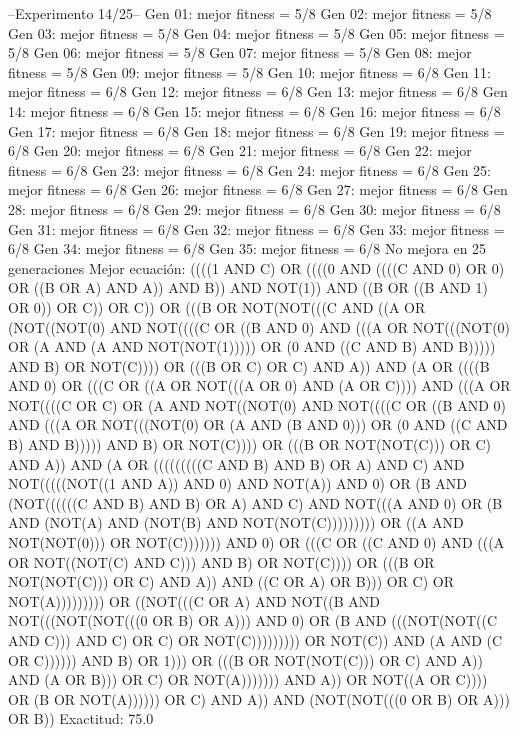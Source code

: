 --Experimento 
 14/25--
Gen 01: mejor fitness = 5/8
Gen 02: mejor fitness = 5/8
Gen 03: mejor fitness = 5/8
Gen 04: mejor fitness = 5/8
Gen 05: mejor fitness = 5/8
Gen 06: mejor fitness = 5/8
Gen 07: mejor fitness = 5/8
Gen 08: mejor fitness = 5/8
Gen 09: mejor fitness = 5/8
Gen 10: mejor fitness = 6/8
Gen 11: mejor fitness = 6/8
Gen 12: mejor fitness = 6/8
Gen 13: mejor fitness = 6/8
Gen 14: mejor fitness = 6/8
Gen 15: mejor fitness = 6/8
Gen 16: mejor fitness = 6/8
Gen 17: mejor fitness = 6/8
Gen 18: mejor fitness = 6/8
Gen 19: mejor fitness = 6/8
Gen 20: mejor fitness = 6/8
Gen 21: mejor fitness = 6/8
Gen 22: mejor fitness = 6/8
Gen 23: mejor fitness = 6/8
Gen 24: mejor fitness = 6/8
Gen 25: mejor fitness = 6/8
Gen 26: mejor fitness = 6/8
Gen 27: mejor fitness = 6/8
Gen 28: mejor fitness = 6/8
Gen 29: mejor fitness = 6/8
Gen 30: mejor fitness = 6/8
Gen 31: mejor fitness = 6/8
Gen 32: mejor fitness = 6/8
Gen 33: mejor fitness = 6/8
Gen 34: mejor fitness = 6/8
Gen 35: mejor fitness = 6/8
No mejora en 25 generaciones
Mejor ecuación: ((((1 AND C) OR ((((0 AND ((((C AND 0) OR 0) OR ((B OR A) AND A)) AND B)) AND NOT(1)) AND ((B OR ((B AND 1) OR 0)) OR C)) OR C)) OR (((B OR NOT(NOT(((C AND ((A OR (NOT((NOT(0) AND NOT((((C OR ((B AND 0) AND (((A OR NOT(((NOT(0) OR (A AND (A AND NOT(NOT(1))))) OR (0 AND ((C AND B) AND B))))) AND B) OR NOT(C)))) OR (((B OR C) OR C) AND A)) AND (A OR ((((B AND 0) OR (((C OR ((A OR NOT(((A OR 0) AND (A OR C)))) AND (((A OR NOT((((C OR C) OR (A AND NOT((NOT(0) AND NOT((((C OR ((B AND 0) AND (((A OR NOT(((NOT(0) OR (A AND (B AND 0))) OR (0 AND ((C AND B) AND B))))) AND B) OR NOT(C)))) OR (((B OR NOT(NOT(C))) OR C) AND A)) AND (A OR (((((((((C AND B) AND B) OR A) AND C) AND NOT(((((NOT((1 AND A)) AND 0) AND NOT(A)) AND 0) OR (B AND (NOT((((((C AND B) AND B) OR A) AND C) AND NOT(((A AND 0) OR (B AND (NOT(A) AND (NOT(B) AND NOT(NOT(C))))))))) OR ((A AND NOT(NOT(0))) OR NOT(C))))))) AND 0) OR (((C OR ((C AND 0) AND (((A OR NOT((NOT(C) AND C))) AND B) OR NOT(C)))) OR (((B OR NOT(NOT(C))) OR C) AND A)) AND ((C OR A) OR B))) OR C) OR NOT(A))))))))) OR ((NOT(((C OR A) AND NOT((B AND NOT(((NOT(NOT(((0 OR B) OR A))) AND 0) OR (B AND (((NOT(NOT((C AND C))) AND C) OR C) OR NOT(C))))))))) OR NOT(C)) AND (A AND (C OR C)))))) AND B) OR 1))) OR (((B OR NOT(NOT(C))) OR C) AND A)) AND (A OR B))) OR C) OR NOT(A))))))) AND A)) OR NOT((A OR C)))) OR (B OR NOT(A)))))) OR C) AND A)) AND (NOT(NOT(((0 OR B) OR A))) OR B))
 Exactitud: 75.0%

